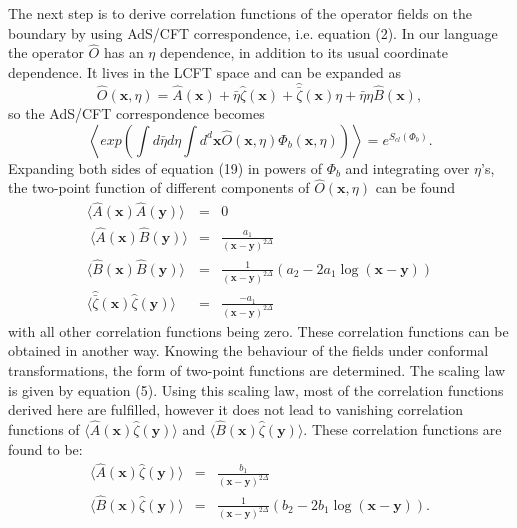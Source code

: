 \documentclass[a4paper,11pt]{article}
\begin{document}
The next step is to derive correlation functions of the operator
fields on the boundary by using AdS/CFT correspondence, i.e.
equation (2). In our language the operator $\hat{O}$ has an $\eta
$ dependence, in addition to its usual coordinate dependence. It
lives in the LCFT space and can be expanded as
\begin{equation}
\hat{O}(\mathbf{x},\eta)=\hat{A}(\mathbf{x})+\bar{\eta}\hat{\zeta}(\mathbf{x})+
\hat{\bar{\zeta}}(\mathbf{x})\eta +\bar{\eta}\eta
\hat{B}(\mathbf{x}),
\end{equation}
so the AdS/CFT correspondence becomes
\begin{equation}
\left\langle exp\left( \int d\bar{\eta}d\eta \int
d^{d}\mathbf{x}\hat{O}(\mathbf{x},\eta )\Phi _{b}
(\mathbf{x},\eta )\right) \right\rangle =e^{S_{cl}(\Phi _{b})}.
\label{AdS/LCFT}
\end{equation}
Expanding both sides of equation (19) in powers of $\Phi _{b}$
and integrating over $\eta $'s, the two-point function of
different components of $\hat{O}(\mathbf{x},\eta )$ can be found
\begin{eqnarray}
\langle \hat{A}(\mathbf{x})\hat{A}(\mathbf{y})\rangle &=&0
\label{corr} \\ \ \langle \hat{A}(\mathbf{x})\hat{B}(\mathbf{y})
\rangle &=&\frac{a_{1}} {(\mathbf{x}-\mathbf{y})^{2\Delta }} \\
\langle \hat{B}(\mathbf{x})\hat{B}(\mathbf{y})\rangle  &=&
\frac{1}{(\mathbf{x}-\mathbf{y})^{2\Delta
}}(a_{2}-2a_{1}\log (\mathbf{x}-\mathbf{y})) \\ \langle
\hat{\bar{\zeta}}(\mathbf{x})\hat{\zeta}(\mathbf{y})\rangle
&=&\frac{-a_{1}}{(\mathbf{x}-\mathbf{y})^{2\Delta }}
\end{eqnarray}
with all other correlation functions being zero. These
correlation functions can be obtained in another way. Knowing the
behaviour of the fields under conformal transformations, the form
of two-point functions are determined. The scaling law is given
by equation (5). Using this scaling law, most of the correlation
functions derived here are fulfilled, however it does not lead to
vanishing correlation functions of $ \langle
\hat{A}(\mathbf{x})\hat{\zeta}(\mathbf{y})\rangle $ and $\langle
\hat{B}(\mathbf{x})\hat{\zeta}(\mathbf{y}) \rangle $. These
correlation functions are found to be:
\begin{eqnarray} \langle
\hat{A}(\mathbf{x})\hat{\zeta}(\mathbf{y})\rangle &=& \frac{b_1}
{\mathbf{(x-y)}^{2\Delta}}
\\ \langle \hat{B}(\mathbf{x})\hat{\zeta}(\mathbf{y})\rangle &=&
\frac{1}{\mathbf{(x-y)}^{2\Delta}} \left( b_2 -2b_1
\log\mathbf{(x-y)} \right).
\end{eqnarray}
\end{document}
